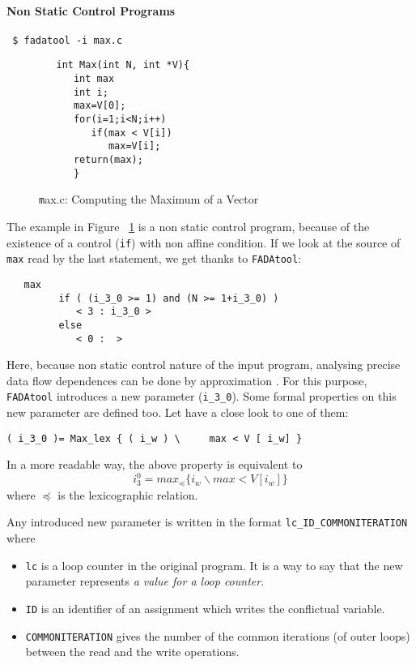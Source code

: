\paragraph{Non Static Control Programs}
\begin{verbatim}
 $ fadatool -i max.c
\end{verbatim}

\begin{figure}[!h]
\begin{footnotesize}
 \begin{verbatim}
   int Max(int N, int *V){
      int max
      int i;
      max=V[0];
      for(i=1;i<N;i++)
         if(max < V[i])
            max=V[i];
      return(max);
      }
 \end{verbatim}
\begin{center}
\begin{scriptsize}
\end{scriptsize}
\end{center}

\end{footnotesize}
\caption{{\texttt max.c}: Computing the Maximum of a Vector}
\label{pgm:max_vect}
\end{figure}
The example in Figure~ \ref{pgm:max_vect} is a non static control program, because of the existence of a control (\verb|if|) with non affine condition.
If we look at the source of \verb|max| read by the last statement, we get thanks to \verb|FADAtool|:
\begin{verbatim}
   max
         if ( (i_3_0 >= 1) and (N >= 1+i_3_0) )
            < 3 : i_3_0 >
         else
            < 0 :  >
\end{verbatim}

Here, because non static control nature of the input program, analysing precise data flow dependences can be done by approximation \cite{barthou_thesis}. For this purpose, \verb|FADAtool| introduces a new parameter (\verb|i_3_0|). Some formal properties on this new parameter are defined too. Let have a close look to one of them:
\begin{verbatim}
( i_3_0 )= Max_lex { ( i_w ) \     max < V [ i_w] }
\end{verbatim}

In a more readable way, the above property is equivalent to 
$$
i_3^0 = max_{\preceq} \{ i_w \backslash  max < V[i_w] \}
$$
where $\preceq$ is the lexicographic relation.

Any introduced new parameter is written in the format \verb|lc_ID_COMMONITERATION| where
\begin{itemize}
 \item \verb|lc| is a loop counter in the original program. It is a way to say that the new parameter represents {\it a value for a loop counter}.
 \item \verb|ID| is an identifier of an assignment which writes the conflictual variable.
 \item \verb|COMMONITERATION| gives the number of the common iterations (of outer loops) between the read and the write operations.
\end{itemize}

